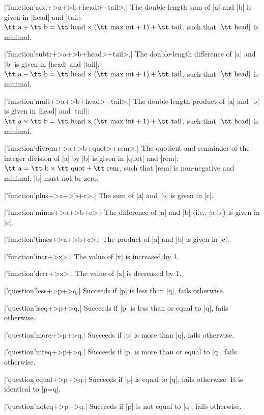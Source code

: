 \documentclass{article}
\begin{document}
\X\pp|'function'add+>a+>b+head>+tail>.|\Y
The double-length sum of \pp|a| and \pp|b| is given in \pp|head| and
\pp|tail|: $\mbox{\tt a}+\mbox{\tt b}=\mbox{\tt head}\times(\mbox{\tt max int}
+1)+\mbox{\tt tail}$, such that $|\mbox{\tt head}|$ is minimal.

\X\pp|'function'subtr+>a+>b+head>+tail>.|\Y
The double-length difference of \pp|a| and \pp|b| is given in \pp|head| and
\pp|tail|: $\mbox{\tt a}-\mbox{\tt b}=\mbox{\tt head}\times(\mbox{\tt max
int}+1)+\mbox{\tt tail}$, such that $|\mbox{\tt head}|$ is minimal.


\X\pp|'function'mult+>a+>b+head>+tail>.|\Y
The double-length product of \pp|a| and \pp|b| is given in \pp|head| and
\pp|tail|: $\mbox{\tt a}\times\mbox{\tt b}=\mbox{\tt head}\times(\mbox{\tt max
int}+1)+\mbox{\tt tail}$, such that $|\mbox{\tt head}|$ is minimal.

\X\pp|'function'divrem+>a+>b+quot>+rem>.|\Y
The quotient and remainder of the integer division of \pp|a| by \pp|b| is
given in \pp|quot| and \pp|rem|: $\mbox{\tt a}=\mbox{\tt b}\times \mbox{\tt
quot}+\mbox{\tt rem}$, such that \pp|rem| is non-negative and minimal.
\pp|b| must not be zero.

\X\pp|'function'plus+>a+>b+c>.|\Y
The sum of \pp|a| and \pp|b| is given in \pp|c|.

\X\pp|'function'minus+>a+>b+c>.|\Y
The difference of \pp|a| and \pp|b| (i.e., \pp|a-b|) is given in \pp|c|.

\X\pp|'function'times+>a+>b+c>.|\Y
The product of \pp|a| and \pp|b| is given in \pp|c|.

\X\pp|'function'incr+>x>.|\Y
The value of \pp|x| is increased by 1.

\X\pp|'function'decr+>x>.|\Y
The value of \pp|x| is decreased by 1.

\smallskip
\X\pp|'question'less+>p+>q.|\Y
Succeeds if \pp|p| is less than \pp|q|, fails otherwise.

\X\pp|'question'lseq+>p+>q.|\Y
Succeeds if \pp|p| is less than or equal to \pp|q|, fails otherwise.

\X\pp|'question'more+>p+>q.|\Y
Succeeds if \pp|p| is more than \pp|q|, fails otherwise.

\X\pp|'question'mreq+>p+>q.|\Y
Succeeds if \pp|p| is more than or equal to \pp|q|, fails otherwise.

\X\pp|'question'equal+>p+>q.|\Y
Succeeds if \pp|p| is equal to \pp|q|, fails otherwise. It is identical to
\pp|p=q|.

\X\pp|'question'noteq+>p+>q.|\Y
Succeeds if \pp|p| is not equal to \pp|q|, fails otherwise.
\end{document}
